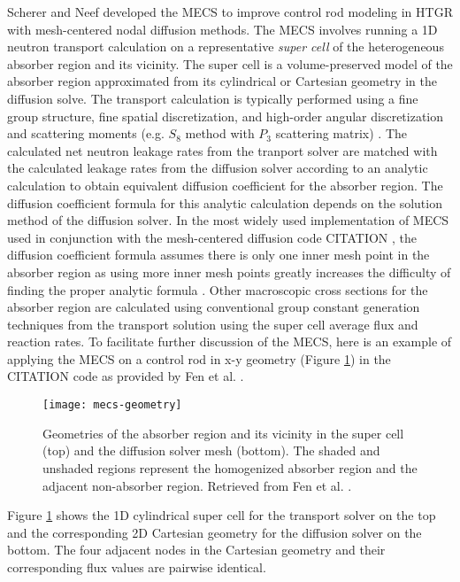 Scherer and Neef developed the \gls{MECS} \cite{scherer_determination_1976} to
improve control rod modeling in \gls{HTGR} with mesh-centered nodal diffusion
methods. The \gls{MECS} involves running a 1D neutron transport calculation on
a representative \textit{super cell} of the heterogeneous absorber region and
its vicinity. The super cell is a volume-preserved model of the absorber region
approximated from its cylindrical or Cartesian geometry in the diffusion solve.
The transport calculation is typically performed using a fine group structure,
fine spatial discretization, and high-order angular discretization and
scattering moments (e.g. $S_8$ method with $P_3$ scattering matrix)
\cite{fen_modelling_1992}. The calculated net neutron leakage
rates from the tranport solver are matched with the calculated leakage rates
from the diffusion solver according to an analytic calculation to obtain
equivalent diffusion coefficient for the absorber region. The diffusion
coefficient formula for this analytic calculation depends on the solution
method of the diffusion solver. In the most widely used implementation of
\gls{MECS} used in conjunction with the mesh-centered diffusion code CITATION
\cite{teuchert_vsop94_1994}, the diffusion coefficient formula assumes there
is only one inner mesh point in the absorber region as using more inner mesh
points greatly increases the difficulty of finding the proper analytic formula
\cite{fen_modelling_1992}. Other macroscopic cross sections for the absorber
region are calculated using conventional group constant generation techniques
from the transport solution using the super cell average flux and reaction
rates. To facilitate further discussion of the \gls{MECS}, here is an example
of applying the \gls{MECS} on a control rod in x-y geometry (Figure
\ref{fig:mecs-geometry}) in the CITATION code as provided by Fen et al.
\cite{fen_modelling_1992}.
%
\begin{figure}[htb!]
    \centering
    \texttt{[image: mecs-geometry]}
    \caption{Geometries of the absorber region and its vicinity in the super
        cell (top) and the diffusion solver mesh (bottom).
        The shaded and unshaded regions represent the homogenized absorber
        region and the adjacent non-absorber region.
        Retrieved from Fen et al. \cite{fen_modelling_1992}.}
    \label{fig:mecs-geometry}
\end{figure}

Figure \ref{fig:mecs-geometry} shows the 1D cylindrical super cell for the
transport solver on the top and the corresponding 2D Cartesian geometry for the
diffusion solver on the bottom. The four adjacent nodes in the Cartesian
geometry and their corresponding flux values are pairwise identical.


